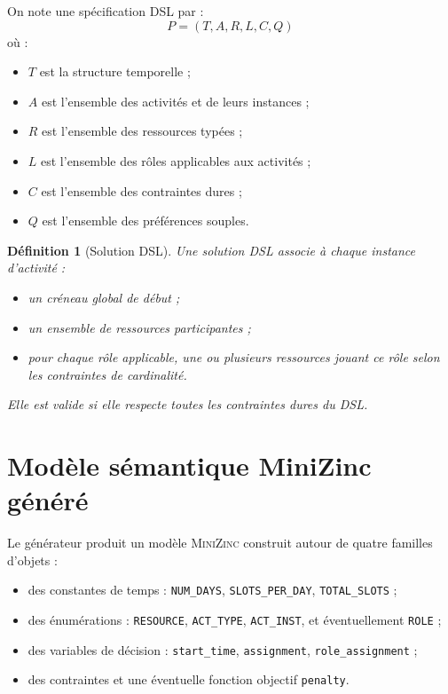 \documentclass[12pt,a4paper]{article}
\newtheorem{definition}{Définition}[section]
\newcommand{\MZN}{\textsc{MiniZinc}}
\begin{document}
On note une spécification DSL par :
\[
P = (T, A, R, L, C, Q)
\]
où :

\begin{itemize}[leftmargin=1.2cm]
  \item $T$ est la structure temporelle ;
  \item $A$ est l'ensemble des activités et de leurs instances ;
  \item $R$ est l'ensemble des ressources typées ;
  \item $L$ est l'ensemble des rôles applicables aux activités ;
  \item $C$ est l'ensemble des contraintes dures ;
  \item $Q$ est l'ensemble des préférences souples.
\end{itemize}

\begin{definition}[Solution DSL]
Une solution DSL associe à chaque instance d'activité :
\begin{itemize}[leftmargin=1.2cm]
  \item un créneau global de début ;
  \item un ensemble de ressources participantes ;
  \item pour chaque rôle applicable, une ou plusieurs ressources jouant ce rôle selon les contraintes de cardinalité.
\end{itemize}
Elle est valide si elle respecte toutes les contraintes dures du DSL.
\end{definition}

\section{Modèle sémantique MiniZinc généré}

Le générateur produit un modèle \MZN{} construit autour de quatre familles d'objets :

\begin{itemize}[leftmargin=1.2cm]
  \item des constantes de temps : \texttt{NUM\_DAYS}, \texttt{SLOTS\_PER\_DAY}, \texttt{TOTAL\_SLOTS} ;
  \item des énumérations : \texttt{RESOURCE}, \texttt{ACT\_TYPE}, \texttt{ACT\_INST}, et éventuellement \texttt{ROLE} ;
  \item des variables de décision : \texttt{start\_time}, \texttt{assignment}, \texttt{role\_assignment} ;
  \item des contraintes et une éventuelle fonction objectif \texttt{penalty}.
\end{itemize}
\end{document}
